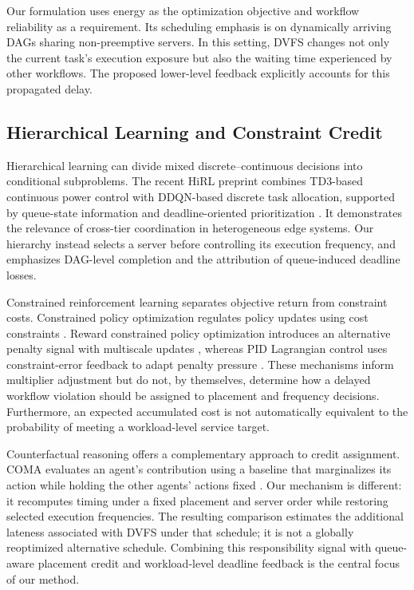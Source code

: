 \documentclass[lettersize,journal]{IEEEtran}
\begin{document}
Our formulation uses energy as the optimization objective and workflow
reliability as a requirement. Its scheduling emphasis is on dynamically
arriving DAGs sharing non-preemptive servers. In this setting, DVFS
changes not only the current task's execution exposure but also the
waiting time experienced by other workflows. The proposed lower-level
feedback explicitly accounts for this propagated delay.

\subsection{Hierarchical Learning and Constraint Credit}

Hierarchical learning can divide mixed discrete--continuous decisions
into conditional subproblems. The recent HiRL preprint combines
TD3-based continuous power control with DDQN-based discrete task
allocation, supported by queue-state information and deadline-oriented
prioritization \cite{zhu2026hirl}. It demonstrates the relevance of
cross-tier coordination in heterogeneous edge systems. Our hierarchy
instead selects a server before controlling its execution frequency,
and emphasizes DAG-level completion and the attribution of queue-induced
deadline losses.

Constrained reinforcement learning separates objective return from
constraint costs. Constrained policy optimization regulates policy
updates using cost constraints \cite{achiam2017}. Reward constrained
policy optimization introduces an alternative penalty signal with
multiscale updates \cite{tessler2019}, whereas PID Lagrangian control
uses constraint-error feedback to adapt penalty pressure
\cite{stooke2020}. These mechanisms inform multiplier adjustment but
do not, by themselves, determine how a delayed workflow violation
should be assigned to placement and frequency decisions. Furthermore,
an expected accumulated cost is not automatically equivalent to the
probability of meeting a workload-level service target.

Counterfactual reasoning offers a complementary approach to credit
assignment. COMA evaluates an agent's contribution using a baseline that
marginalizes its action while holding the other agents' actions fixed
\cite{foerster2018coma}. Our mechanism is different: it recomputes timing
under a fixed placement and server order while restoring selected
execution frequencies. The resulting comparison estimates the
additional lateness associated with DVFS under that schedule; it is
not a globally reoptimized alternative schedule. Combining this
responsibility signal with queue-aware placement credit and
workload-level deadline feedback is the central focus of our method.
\end{document}
